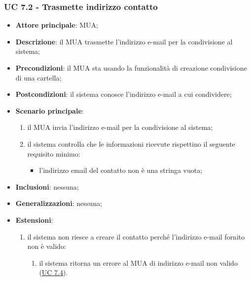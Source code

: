     \subsubsection{UC 7.2 - Trasmette indirizzo contatto} \label{sec:UC7.2}
    \begin{itemize}
        \item \textbf{Attore principale}: MUA;
        \item \textbf{Descrizione}: il MUA trasmette l'indirizzo e-mail per la condivisione al sistema;
        \item \textbf{Precondizioni}: il MUA sta usando la funzionalità di creazione condivisione di una cartella;
        \item \textbf{Postcondizioni}: il sistema conosce l'indirizzo e-mail a cui condividere;
        \item \textbf{Scenario principale}:
            \begin{enumerate}
                \item il MUA invia l'indirizzo e-mail per la condivisione al sistema;
                \item il sistema controlla che le informazioni ricevute rispettino il seguente requisito minimo:
                    \begin{itemize}
                        \item l'indirizzo email del contatto non è una stringa vuota;
                    \end{itemize}
            \end{enumerate}
        \item \textbf{Inclusioni}: nessuna;
        \item \textbf{Generalizzazioni}: nessuna;
        \item \textbf{Estensioni}:
            \begin{enumerate}[label=\alph*.]
                \item il sistema non riesce a creare il contatto perché l'indirizzo e-mail fornito non è valido:
                \begin{enumerate}[label=\arabic*.]
                    \item il sistema ritorna un errore al MUA di indirizzo e-mail non valido (\hyperref[sec:UC7.4]{UC 7.4}).
                \end{enumerate}
            \end{enumerate}
    \end{itemize}


